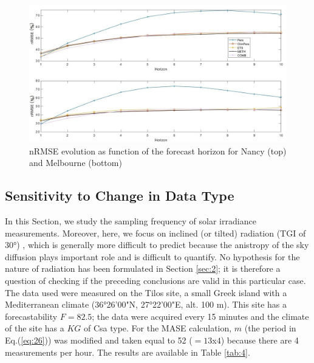 \begin{figure}[tb]
\includegraphics[scale=0.5]{fig4.jpg}%
\caption{nRMSE evolution as function of the forecast horizon for Nancy (top) and Melbourne (bottom)} 
\label{fig:fig4}
\end{figure}

\subsection{Sensitivity to Change in Data Type}

In this Section, we study the sampling frequency of solar irradiance measurements. Moreover, here, we focus on inclined (or tilted) radiation (TGI of 30°) \citep{david_evaluating_2013}, which is generally more difficult to predict because the anistropy of the sky diffusion plays important role and is difficult to quantify. No hypothesis for the nature of radiation has been formulated in Section \ref{sec:2}; it is therefore a question of checking if the preceding conclusions are valid in this particular case. The data used were measured on the Tilos site, a small Greek island with a Mediterranean climate (36°26'00"N, 27°22'00"E, alt. 100 m). This site has a forecastability $ F =  82.5$; the data were acquired every 15 minutes and the climate of the site has a $KG$ of Csa type. For the MASE calculation, $m$ (the period in Eq.(\ref{eq:26})) was modified and taken equal to 52 ($= 13$x$4$) because there are 4 measurements per hour. The results are available in Table \ref{tab:4}.

